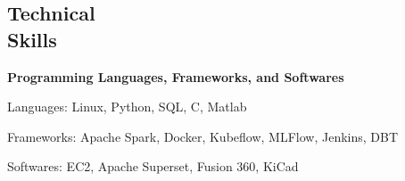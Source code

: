 \documentclass[margin,line]{./templates/resume}
\begin{document}
\begin{resume}



\section{\mysidestyle Technical\\Skills}
\textbf{Programming Languages, Frameworks, and Softwares}
\begin{list2}
    \item{Languages: Linux, Python, SQL, C, Matlab}
    \item{Frameworks: Apache Spark, Docker, Kubeflow, MLFlow, Jenkins, DBT}
    \item{Softwares: EC2, Apache Superset, Fusion 360, KiCad}
\end{list2}






\end{resume}
\end{document}
